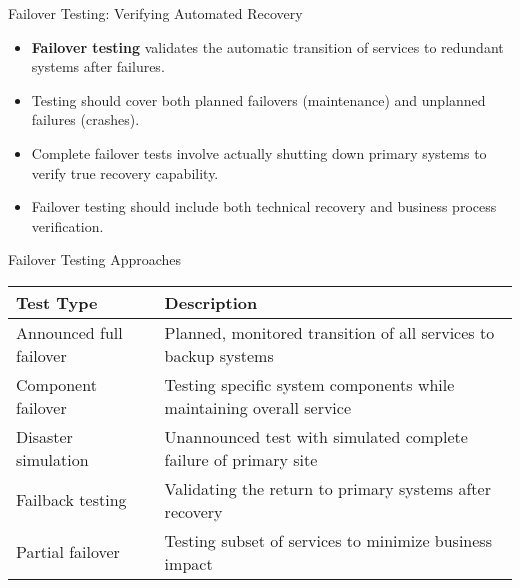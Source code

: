 \documentclass{beamer}
\begin{document}
\begin{frame}{Failover Testing: Verifying Automated Recovery}
    \begin{itemize}
        \item \textbf{Failover testing} validates the automatic transition of services to redundant systems after failures.
        \item Testing should cover both planned failovers (maintenance) and unplanned failures (crashes).
        \item Complete failover tests involve actually shutting down primary systems to verify true recovery capability.
        \item Failover testing should include both technical recovery and business process verification.
    \end{itemize}
    
    \begin{block}{Failover Testing Approaches}
        \scriptsize
        \begin{tabular}{p{3.5cm}p{6.5cm}}
            \textbf{Test Type} & \textbf{Description} \\
            \hline
            Announced full failover & Planned, monitored transition of all services to backup systems \\
            Component failover & Testing specific system components while maintaining overall service \\
            Disaster simulation & Unannounced test with simulated complete failure of primary site \\
            Failback testing & Validating the return to primary systems after recovery \\
            Partial failover & Testing subset of services to minimize business impact \\
        \end{tabular}
    \end{block}
\end{frame}
\end{document}
